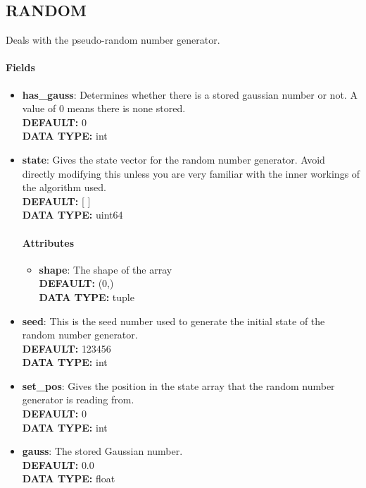 \subsection{RANDOM}
\label{RANDOM}
Deals with the pseudo-random number generator.
\paragraph{Fields}
 \begin{itemize}
\item {\bf has\_gauss}:
 Determines whether there is a stored gaussian number or not. A value of 0 means there is none stored.
{\\ \bf DEFAULT: }0
{\\ \bf DATA TYPE: }int
\item {\bf state}:
 Gives the state vector for the random number generator. Avoid directly modifying this unless you are very familiar with the inner workings of the algorithm used.
{\\ \bf DEFAULT: }[ ]
{\\ \bf DATA TYPE: }uint64
\paragraph{Attributes}
 \begin{itemize}
\item {\bf shape}:
 The shape of the array
{\\ \bf DEFAULT: }(0,)
{\\ \bf DATA TYPE: }tuple
\end{itemize}
 
\item {\bf seed}:
 This is the seed number used to generate the initial state of the random number generator.
{\\ \bf DEFAULT: }123456
{\\ \bf DATA TYPE: }int
\item {\bf set\_pos}:
 Gives the position in the state array that the random number generator is reading from.
{\\ \bf DEFAULT: }0
{\\ \bf DATA TYPE: }int
\item {\bf gauss}:
 The stored Gaussian number.
{\\ \bf DEFAULT: }0.0
{\\ \bf DATA TYPE: }float
\end{itemize}
 
